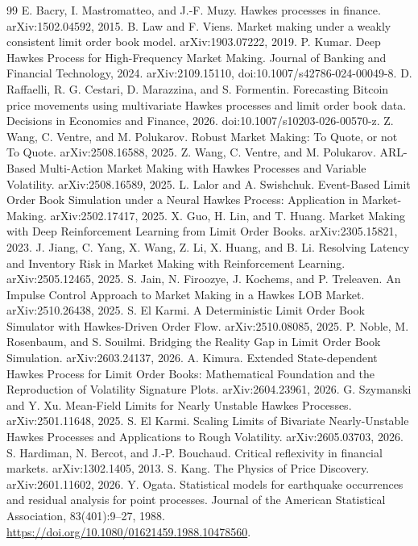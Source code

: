 \documentclass[review]{siamonline250211}
\begin{document}
\begin{thebibliography}{99}
 E. Bacry, I. Mastromatteo, and J.-F. Muzy. Hawkes
processes in finance. arXiv:1502.04592, 2015.
 B. Law and F. Viens. Market making under a weakly
consistent limit order book model. arXiv:1903.07222, 2019.
 P. Kumar. Deep Hawkes Process for High-Frequency Market
Making. Journal of Banking and Financial Technology, 2024. arXiv:2109.15110,
doi:10.1007/s42786-024-00049-8.
 D. Raffaelli, R. G. Cestari, D. Marazzina, and
S. Formentin. Forecasting Bitcoin price movements using multivariate Hawkes
processes and limit order book data. Decisions in Economics and Finance, 2026.
doi:10.1007/s10203-026-00570-z.
 Z. Wang, C. Ventre, and M. Polukarov. Robust
Market Making: To Quote, or not To Quote. arXiv:2508.16588, 2025.
 Z. Wang, C. Ventre, and M. Polukarov. ARL-Based
Multi-Action Market Making with Hawkes Processes and Variable Volatility.
arXiv:2508.16589, 2025.
 L. Lalor and A. Swishchuk. Event-Based Limit
Order Book Simulation under a Neural Hawkes Process: Application in
Market-Making. arXiv:2502.17417, 2025.
 X. Guo, H. Lin, and T. Huang. Market Making with
Deep Reinforcement Learning from Limit Order Books. arXiv:2305.15821, 2023.
 J. Jiang, C. Yang, X. Wang, Z. Li, X. Huang, and B. Li.
Resolving Latency and Inventory Risk in Market Making with Reinforcement
Learning. arXiv:2505.12465, 2025.
 S. Jain, N. Firoozye, J. Kochems, and P. Treleaven. An
Impulse Control Approach to Market Making in a Hawkes LOB Market.
arXiv:2510.26438, 2025.
 S. El Karmi. A Deterministic Limit Order Book
Simulator with Hawkes-Driven Order Flow. arXiv:2510.08085, 2025.
 P. Noble, M. Rosenbaum, and S. Souilmi. Bridging the
Reality Gap in Limit Order Book Simulation. arXiv:2603.24137, 2026.
 A. Kimura. Extended State-dependent Hawkes Process for
Limit Order Books: Mathematical Foundation and the Reproduction of Volatility
Signature Plots. arXiv:2604.23961, 2026.
 G. Szymanski and Y. Xu. Mean-Field Limits for
Nearly Unstable Hawkes Processes. arXiv:2501.11648, 2025.
 S. El Karmi. Scaling Limits of Bivariate
Nearly-Unstable Hawkes Processes and Applications to Rough Volatility.
arXiv:2605.03703, 2026.
 S. Hardiman, N. Bercot, and J.-P. Bouchaud. Critical
reflexivity in financial markets. arXiv:1302.1405, 2013.
 S. Kang. The Physics of Price Discovery. arXiv:2601.11602,
2026.
 Y. Ogata. Statistical models for earthquake occurrences
and residual analysis for point processes. Journal of the American Statistical
Association, 83(401):9--27, 1988.
\url{https://doi.org/10.1080/01621459.1988.10478560}.
\end{thebibliography}
\end{document}
